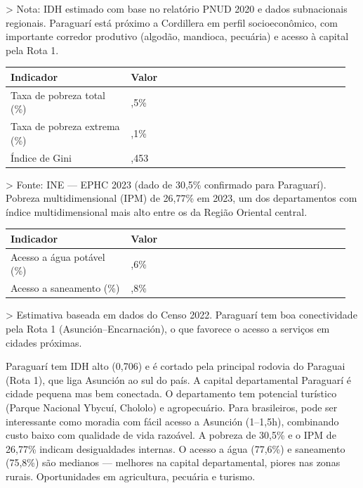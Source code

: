 > Nota: IDH estimado com base no relatório PNUD 2020 e dados subnacionais regionais. Paraguarí está próximo a Cordillera em perfil socioeconômico, com importante corredor produtivo (algodão, mandioca, pecuária) e acesso à capital pela Rota 1.


{\small
\setlength{\tabcolsep}{3pt}
\renewcommand{\arraystretch}{1.12}
\begin{tabularx}{\linewidth}{>{\raggedright\arraybackslash}p{0.34\linewidth} >{\raggedright\arraybackslash}p{0.62\linewidth}}
\toprule
Indicador & Valor \\
\midrule
Taxa de pobreza total (\%) & 30,5\% \\
Taxa de pobreza extrema (\%) & 7,1\% \\
Índice de Gini & 0,453 \\
\bottomrule
\end{tabularx}
}

> Fonte: INE --- EPHC 2023 (dado de 30,5\% confirmado para Paraguarí). Pobreza multidimensional (IPM) de 26,77\% em 2023, um dos departamentos com índice multidimensional mais alto entre os da Região Oriental central.


{\small
\setlength{\tabcolsep}{3pt}
\renewcommand{\arraystretch}{1.12}
\begin{tabularx}{\linewidth}{>{\raggedright\arraybackslash}p{0.34\linewidth} >{\raggedright\arraybackslash}p{0.62\linewidth}}
\toprule
Indicador & Valor \\
\midrule
Acesso a água potável (\%) & 77,6\% \\
Acesso a saneamento (\%) & 75,8\% \\
\bottomrule
\end{tabularx}
}

> Estimativa baseada em dados do Censo 2022. Paraguarí tem boa conectividade pela Rota 1 (Asunción--Encarnación), o que favorece o acesso a serviços em cidades próximas.


Paraguarí tem IDH alto (0,706) e é cortado pela principal rodovia do Paraguai (Rota 1), que liga Asunción ao sul do país. A capital departamental Paraguarí é cidade pequena mas bem conectada. O departamento tem potencial turístico (Parque Nacional Ybycuí, Chololo) e agropecuário. Para brasileiros, pode ser interessante como moradia com fácil acesso a Asunción (1--1,5h), combinando custo baixo com qualidade de vida razoável. A pobreza de 30,5\% e o IPM de 26,77\% indicam desigualdades internas. O acesso a água (77,6\%) e saneamento (75,8\%) são medianos --- melhores na capital departamental, piores nas zonas rurais. Oportunidades em agricultura, pecuária e turismo.


